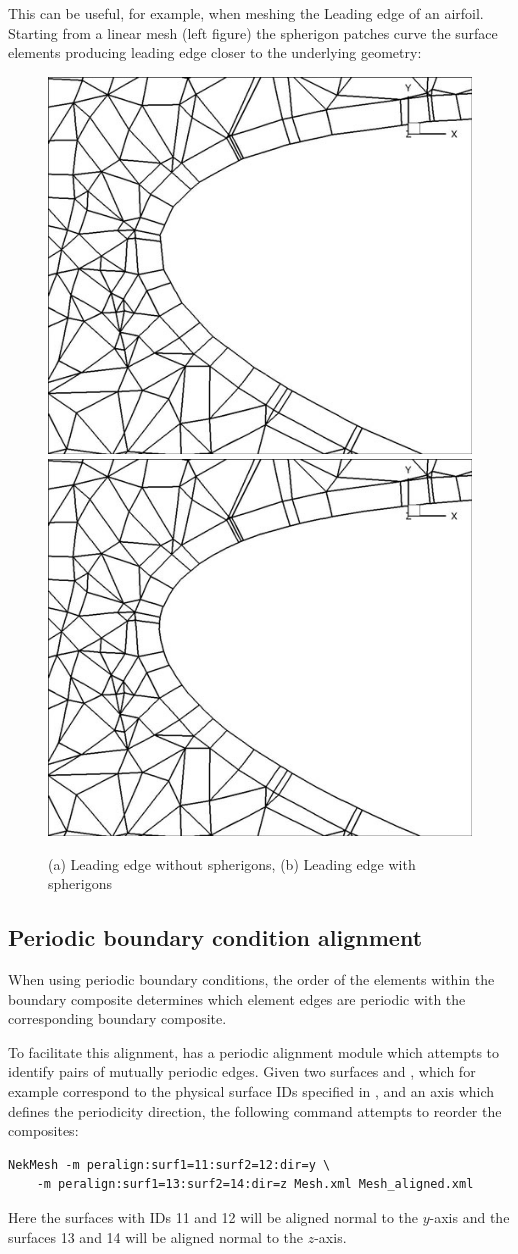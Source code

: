 This can be useful, for example, when meshing the Leading edge of an
airfoil. Starting from a linear mesh (left figure) the spherigon patches curve
the surface elements producing leading edge closer to the underlying geometry:

\begin{figure}[!htbp]
  \begin{center}
    \includegraphics[width = 0.47 \textwidth]{img/noSphnoBL.jpg}
    \includegraphics[width = 0.47 \textwidth]{img/SphnoBL.jpg}
    \caption{(a) Leading edge without spherigons, (b) Leading edge with
      spherigons}
  \end{center}
\end{figure}

\subsection{Periodic boundary condition alignment}

When using periodic boundary conditions, the order of the elements within the
boundary composite determines which element edges are periodic with the
corresponding boundary composite.

To facilitate this alignment, \nm has a periodic alignment module
which attempts to identify pairs of mutually periodic edges. Given two
surfaces  and , which for example correspond
to the physical surface IDs specified in \gmsh, and an axis which
defines the periodicity direction, the following command attempts to
reorder the composites:
%
\begin{lstlisting}[style=BashInputStyle]
NekMesh -m peralign:surf1=11:surf2=12:dir=y \
    -m peralign:surf1=13:surf2=14:dir=z Mesh.xml Mesh_aligned.xml
\end{lstlisting}
%
Here the surfaces with IDs 11 and 12 will be aligned normal to the $y$-axis and
the surfaces 13 and 14 will be aligned normal to the $z$-axis.

